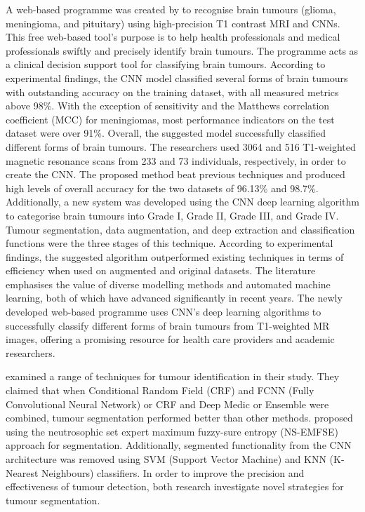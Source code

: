 \documentclass[12pt, a4paper,twoside]{report}
\theoremstyle{plain} %
\theoremstyle{definition} %
\theoremstyle{remark} %
\numberwithin{equation}{chapter}
\begin{document}
A web-based programme was created by \cite{zhou20} to recognise brain tumours (glioma, meningioma, and pituitary) using high-precision T1 contrast MRI and CNNs. This free web-based tool's purpose is to help health professionals and medical professionals swiftly and precisely identify brain tumours. The programme acts as a clinical decision support tool for classifying brain tumours. According to experimental findings, the CNN model classified several forms of brain tumours with outstanding accuracy on the training dataset, with all measured metrics above 98\%. With the exception of sensitivity and the Matthews correlation coefficient (MCC) for meningiomas, most performance indicators on the test dataset were over 91\%. Overall, the suggested model successfully classified different forms of brain tumours. The researchers used 3064 and 516 T1-weighted magnetic resonance scans from 233 and 73 individuals, respectively, in order to create the CNN. The proposed method beat previous techniques and produced high levels of overall accuracy for the two datasets of 96.13\% and 98.7\%. Additionally, a new system was developed using the CNN deep learning algorithm to categorise brain tumours into Grade I, Grade II, Grade III, and Grade IV. Tumour segmentation, data augmentation, and deep extraction and classification functions were the three stages of this technique. According to experimental findings, the suggested algorithm outperformed existing techniques in terms of efficiency when used on augmented and original datasets. The literature emphasises the value of diverse modelling methods and automated machine learning, both of which have advanced significantly in recent years. The newly developed web-based programme uses CNN's deep learning algorithms to successfully classify different forms of brain tumours from T1-weighted MR images, offering a promising resource for health care providers and academic researchers.

\cite{wadhwa19} examined a range of techniques for tumour identification in their study. They claimed that when Conditional Random Field (CRF) and FCNN (Fully Convolutional Neural Network) or CRF and Deep Medic or Ensemble were combined, tumour segmentation performed better than other methods. \cite{ozyurt19} proposed using the neutrosophic set expert maximum fuzzy-sure entropy (NS-EMFSE) approach for segmentation. Additionally, segmented functionality from the CNN architecture was removed using SVM (Support Vector Machine) and KNN (K-Nearest Neighbours) classifiers. In order to improve the precision and effectiveness of tumour detection, both research investigate novel strategies for tumour segmentation.
\end{document}
